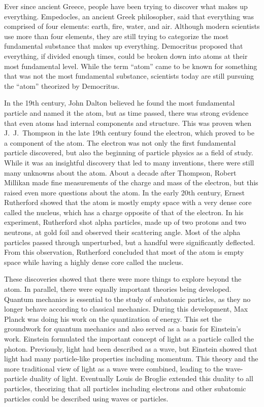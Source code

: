 Ever since ancient Greece, people have been trying to discover what makes up everything. Empedocles, an ancient Greek philosopher, said that everything was comprised of four elements: earth, fire, water, and air. Although modern scientists use more than four elements, they are still trying to categorize the most fundamental substance that makes up everything. Democritus proposed that everything, if divided enough times, could be broken down into atoms at their most fundamental level. While the term ``atom'' came to be known for something that was not the most fundamental substance, scientists today are still pursuing the ``atom'' theorized by Democritus. 

In the 19th century, John Dalton believed he found the most fundamental particle and named it the atom, but as time passed, there was strong evidence that even atoms had internal components and structure. This was proven when J.~J.~Thompson in the late 19th century found the electron, which proved to be a component of the atom. The electron was not only the first fundamental particle discovered, but also the beginning of particle physics as a field of study. While it was an insightful discovery that led to many inventions, there were still many unknowns about the atom. About a decade after Thompson, Robert Millikan made fine measurements of the charge and mass of the electron, but this raised even more questions about the atom. In the early 20th century, Ernest Rutherford showed that the atom is mostly empty space with a very dense core called the nucleus, which has a charge opposite of that of the electron. In his experiment, Rutherford shot alpha particles, made up of two protons and two neutrons, at gold foil and observed their scattering angle. Most of the alpha particles passed through unperturbed, but a handful were significantly deflected. From this observation, Rutherford concluded that most of the atom is empty space while having a highly dense core called the nucleus. 

These discoveries showed that there were more things to explore beyond the atom.  In parallel, there were equally important theories being developed. Quantum mechanics is essential to the study of subatomic particles, as they no longer behave according to classical mechanics. During this development, Max Planck was doing his work on the quantization of energy. This set the groundwork for quantum mechanics and also served as a basis for Einstein's work. Einstein formulated the important concept of light as a particle called the photon. Previously, light had been described as a wave, but Einstein showed that light had many particle-like properties including momentum. This theory and the more traditional view of light as a wave were combined, leading to the wave-particle duality of light. Eventually Louis de Broglie extended this duality to all particles, theorizing that all particles including electrons and other subatomic particles could be described using waves or particles.

